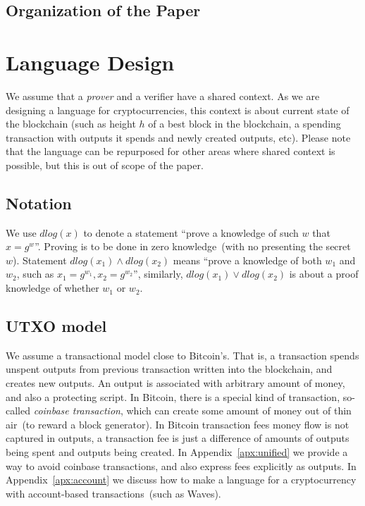 \documentclass[]{llncs}
\begin{document}
\subsection{Organization of the Paper}

\section{Language Design}

We assume that a {\em prover} and a {verifier} have a shared context. As we are designing a language for cryptocurrencies, this context is about current state of the blockchain (such as height $h$ of a best block in the blockchain, a spending transaction with outputs it spends and newly created outputs, etc). Please note that the language can be repurposed for other areas where shared context is possible, but this is out of scope of the paper.

\subsection{Notation}

We use $dlog(x)$ to denote a statement ``prove a knowledge of such $w$ that $x = g^w$''. Proving is to be done in zero knowledge~(with no presenting the secret $w$). Statement $dlog(x_1) \land dlog(x_2)$ means ``prove a knowledge of both $w_1$ and $w_2$, such as $x_1 = g^{w_1}, x_2 = g^{w_2}$'', similarly, $dlog(x_1) \lor dlog(x_2)$ is about a proof knowledge of whether $w_1$ or $w_2$. 

\subsection{UTXO model}

We assume a transactional model close to Bitcoin's. That is, a transaction spends unspent outputs from previous transaction written into the blockchain, and creates new outputs. An output is associated with arbitrary amount of money, and also a protecting script. In Bitcoin, there is a special kind of transaction, so-called {\em coinbase transaction}, which can create some amount of money out of thin air~(to reward a block generator). In Bitcoin transaction fees money flow is not captured in outputs, a transaction fee is just a difference of amounts of outputs being spent and outputs being created. In Appendix~\ref{apx:unified} we provide a way to avoid coinbase transactions, and also express fees explicitly as outputs. In Appendix~\ref{apx:account} we discuss how to make a language for a cryptocurrency with account-based transactions~(such as Waves).
\end{document}
